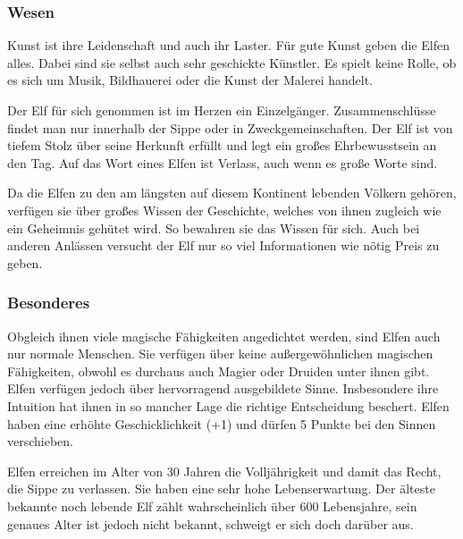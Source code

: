 \subsubsection{Wesen}
\par Kunst ist ihre Leidenschaft und auch ihr Laster. Für gute
Kunst geben die Elfen alles. Dabei sind sie selbst auch sehr
geschickte Künstler. Es spielt keine Rolle, ob es sich um Musik,
Bildhauerei oder die Kunst der Malerei handelt.
\par Der Elf für sich genommen ist im Herzen ein Einzelgänger.
Zusammenschlüsse findet man nur innerhalb der Sippe oder in
Zweckgemeinschaften. Der Elf ist von tiefem Stolz über seine
Herkunft erfüllt und legt ein großes Ehrbewusstsein an den Tag.
Auf das Wort eines Elfen ist Verlass, auch wenn es große Worte
sind.
\par Da die Elfen zu den am längsten auf diesem Kontinent lebenden
Völkern gehören, verfügen sie über großes Wissen der
Geschichte, welches von ihnen zugleich wie ein Geheimnis gehütet
wird. So bewahren sie das Wissen für sich. Auch bei anderen
Anlässen versucht der Elf nur so viel Informationen wie nötig
Preis zu geben.
\subsubsection{Besonderes}
\par Obgleich ihnen viele magische Fähigkeiten angedichtet werden,
sind Elfen auch nur \glqq normale Menschen\grqq{}. Sie verfügen über
keine außergewöhnlichen magischen Fähigkeiten, obwohl es durchaus
auch Magier oder Druiden unter ihnen gibt. Elfen verfügen jedoch
über hervorragend ausgebildete Sinne. Insbesondere ihre Intuition
hat ihnen in so mancher Lage die richtige Entscheidung beschert.
Elfen haben eine erhöhte Geschicklichkeit (+1) und dürfen 5 Punkte
bei den Sinnen verschieben.
\par Elfen erreichen im Alter von 30 Jahren die Volljährigkeit und
damit das Recht, die Sippe zu verlassen. Sie haben eine sehr hohe
Lebenserwartung. Der älteste bekannte noch lebende Elf zählt
wahrscheinlich über 600 Lebensjahre, sein genaues Alter ist jedoch
nicht bekannt, schweigt er sich doch darüber aus.
